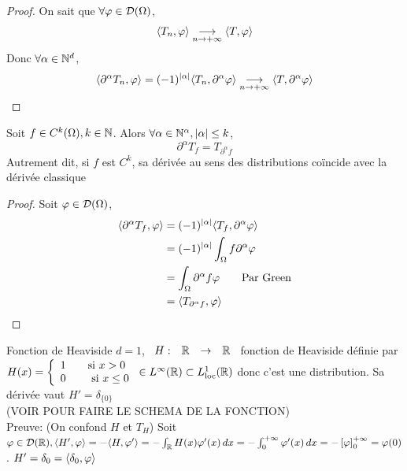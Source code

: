 \documentclass[]{report}
\begin{document}
    \begin{proof}
        On sait que $\forall \varphi\in \mathcal{D}(\Omega)$,
        \[\langle T_n,\varphi \rangle\underset{n\to +\infty}{\longrightarrow} \langle T,\varphi \rangle\]
        Donc $\forall \alpha\in \mathbb{N}^d$,
        \[\langle \partial^\alpha T_n,\varphi \rangle=(-1)^{|\alpha|}\langle T_n,\partial^\alpha\varphi \rangle\underset{n\to +\infty}{\longrightarrow} \langle T,\partial^\alpha \varphi \rangle\]
    \end{proof}

    \begin{prop}{}{}
        Soit $f\in C^k(\Omega), k\in \mathbb{N}$. Alors $\forall \alpha \in \mathbb{N}^\alpha,|\alpha|\le k$,
        \[\partial^\alpha T_f=T_{\partial^\alpha f}\]
        Autrement dit, si $f$ est $C^k$, sa dérivée au sens des distributions coïncide avec la dérivée classique
    \end{prop}

    \begin{proof}
        Soit $\varphi\in \mathcal{D}(\Omega)$,
        \begin{align*}
            \langle \partial^\alpha T_f,\varphi \rangle&=(-1)^{|\alpha|}\langle T_f,\partial^\alpha \varphi \rangle\\
            &=(-1)^{|\alpha|}\int_\Omega f\partial^\alpha \varphi\\
            &=\int_{\Omega}\partial^\alpha f\varphi\qquad \text{Par Green}\\
            &=\langle  T_{\partial^\alpha f},\varphi \rangle
        \end{align*}
    \end{proof}

    \begin{ex}{Fonction de Heaviside}{}
        $d=1$, $\begin{array}{ccccc} H : & \mathbb{R} & \to & \mathbb{R} \end{array}$ fonction de Heaviside définie par $H(x)=\left\{\begin{array}{ll} 1\qquad \text{si $x>0$}\\ 0\qquad \text{ si $x\le 0$} \end{array} \right.\in L^{\infty}(\mathbb{R})\subset L^1_{\text{loc}}(\mathbb{R})$ donc c'est une distribution. Sa dérivée vaut $H'=\delta_{\{0\}}$\\
        (VOIR POUR FAIRE LE SCHEMA DE LA FONCTION)\\
        Preuve: (On confond $H$ et $T_H$) Soit $\varphi\in \mathcal{D}(\mathbb{R}),\langle H',\varphi \rangle=-\langle H,\varphi' \rangle=-\int_{\mathbb{R}} H(x)\varphi'(x)\, dx=-\int_{0}^{+\infty}\varphi'(x)\, dx=-\left[\varphi\right]_0^{+\infty}=\varphi(0)$. $H'=\delta_0=\langle \delta_0,\varphi \rangle$
    \end{ex}
\end{document}
